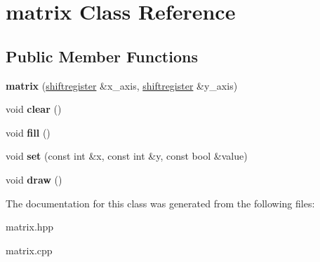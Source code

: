 \hypertarget{classmatrix}{}\section{matrix Class Reference}
\label{classmatrix}
\subsection*{Public Member Functions}
\begin{DoxyCompactItemize}
\item 
\mbox{\label{classmatrix_a92954637a70d413fc3a9889764aac6b8}} 
{\bfseries matrix} (\mbox{\hyperlink{classshiftregister}{shiftregister}} \&x\+\_\+axis, \mbox{\hyperlink{classshiftregister}{shiftregister}} \&y\+\_\+axis)
\item 
\mbox{\label{classmatrix_a58f399a7e96f56100491d6d8ad235f68}} 
void {\bfseries clear} ()
\item 
\mbox{\label{classmatrix_ad7cdf460c38d607314926df4a646caf1}} 
void {\bfseries fill} ()
\item 
\mbox{\label{classmatrix_af71f156ecaf9259e189acd52df040f7b}} 
void {\bfseries set} (const int \&x, const int \&y, const bool \&value)
\item 
\mbox{\label{classmatrix_ac9f01b9d67a8cdd620e73d446d81d85f}} 
void {\bfseries draw} ()
\end{DoxyCompactItemize}


The documentation for this class was generated from the following files\+:\begin{DoxyCompactItemize}
\item 
matrix.\+hpp\item 
matrix.\+cpp\end{DoxyCompactItemize}

